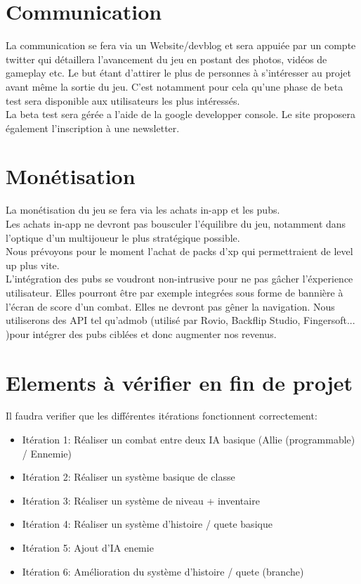 \documentclass[16pt, oneside]{report}
\begin{document}
\chapter{Communication}
La communication se fera via un Website/devblog et sera appui\'ee par un compte twitter qui d\'etaillera l'avancement du jeu en postant des photos, vid\'eos de gameplay etc. Le but \'etant d'attirer le plus de personnes \`a s'int\'eresser au projet avant m\^eme la sortie du jeu. C'est notamment pour cela qu'une phase de beta test sera disponible aux utilisateurs les plus int\'eress\'es.\\
 La beta test sera g\'er\'ee a l'aide de la google developper console. Le site proposera \'egalement l'inscription \`a une newsletter. 


\chapter{Mon\'etisation}
La mon\'etisation du jeu se fera via les achats in-app et les pubs.\\
Les achats in-app ne devront pas bousculer l'\'equilibre du jeu, notamment dans l'optique d'un multijoueur le plus strat\'egique possible.\\
Nous pr\'evoyons pour le moment l'achat de packs d'xp qui permettraient de level up plus vite. \\
L'int\'egration des pubs se voudront non-intrusive pour ne pas g\^acher l'\'experience utilisateur.
Elles pourront \^etre par exemple integr\'ees sous forme de banni\`ere \`a l'\'ecran de score d'un combat. Elles ne devront pas g\^ener la navigation. Nous utiliserons des API tel qu'admob (utilis\'e par Rovio, Backflip Studio, Fingersoft... )pour int\'egrer des pubs cibl\'ees et donc augmenter nos revenus.

\chapter{Elements \`a v\'erifier en fin de projet}
Il faudra verifier que les diff\'erentes it\'erations fonctionnent correctement:\\
\begin{itemize}
	\item It\'eration 1: R\'ealiser un combat entre deux IA basique (Allie (programmable) / Ennemie)
	\item It\'eration 2: R\'ealiser un syst\`eme basique de classe 
	\item It\'eration 3: R\'ealiser un syst\`eme de niveau + inventaire
	\item It\'eration 4: R\'ealiser un syst\`eme d'histoire / quete basique
	\item It\'eration 5: Ajout d'IA enemie
	\item It\'eration 6: Am\'elioration du syst\`eme d'histoire / quete (branche)
\end{itemize}
\end{document}
